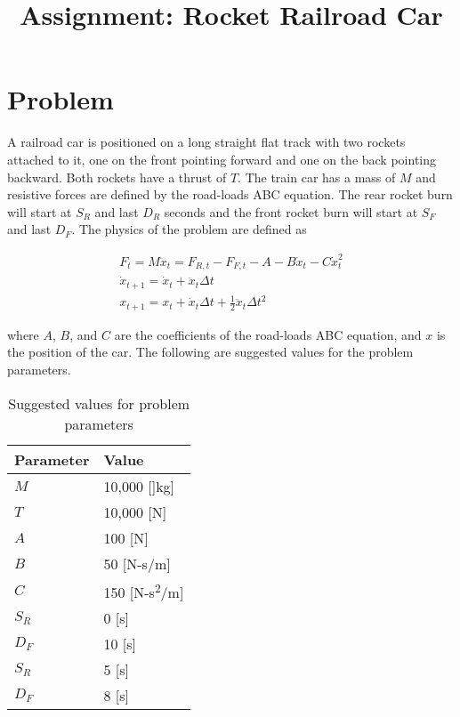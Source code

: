 \documentclass[12pt]{article}
\title{Assignment: Rocket Railroad Car}
\author{}
\date{}
\begin{document}
\maketitle

\section*{Problem}

A railroad car is positioned on a long straight flat track with two rockets attached to it, one on the front pointing forward and one on the back pointing backward. Both rockets have a thrust of $T$. The train car has a mass of $M$ and resistive forces are defined by the road-loads ABC equation. The rear rocket burn will start at $S_R$ and last $D_R$ seconds and the front rocket burn will start at $S_F$ and last $D_F$. The physics of the problem are defined as

\begin{gather}
	F_t=M\ddot{x}_t=F_{R,t}-F_{F,t}-A-B\dot{x}_t-C\dot{x}_t^2\\
	\dot{x}_{t+1}=\dot{x}_t+\ddot{x}_t\Delta t\\
	x_{t+1}=x_t+\dot{x}_t\Delta t+\frac{1}{2}\ddot{x}_t\Delta t^2
\end{gather}

where $A$, $B$, and $C$ are the coefficients of the road-loads ABC equation, and $x$ is the position of the car. The following are suggested values for the problem parameters.

\begin{table}[H]
	\centering
	\caption{Suggested values for problem parameters}
	\begin{tabular}{|C{\linewidth/3}|C{\linewidth/3}|}
		\hline Parameter & Value\\
		\hline $M$ & 10,000 []kg]\\
		\hline $T$ & 10,000 [N]\\
		\hline $A$ & 100 [N]\\
		\hline $B$ & 50 [N-s/m]\\
		\hline $C$ & 150 [N-s\textsuperscript{2}/m]\\
		\hline $S_R$ & 0 [s] \\
		\hline $D_F$ & 10 [s] \\
		\hline $S_R$ & 5 [s] \\
		\hline $D_F$ & 8 [s] \\
		\hline
	\end{tabular}
\end{table}
\end{document}
